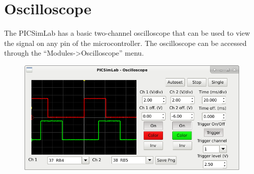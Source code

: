 \chapter{Oscilloscope}
 
 The PICSimLab has a basic two-channel oscilloscope that can be used to view the signal on any pin of the microcontroller. The oscilloscope can be accessed through the ``Modules->Oscilloscope'' menu.
 \begin{figure}[H]
\center
\includegraphics[width=0.99\textwidth]{img/osc.png} 
\end{figure} 

